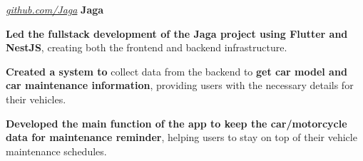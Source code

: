\documentclass[../main.tex]{subfiles}
\begin{document}
\vspace{0.2 cm}

\begin{twocolentry}{
    \small
    \textit{\href{https://github.com/cattyman919/Jaga}{github.com/Jaga}}
}
    \textbf{Jaga}
\end{twocolentry}

\vspace{0.10 cm}
\begin{onecolentry}
\begin{highlights}
    \item \textbf{Led the fullstack development of the Jaga project using Flutter and NestJS}, creating both the frontend and backend infrastructure.
    \item \textbf{Created a system to} collect data from the backend to \textbf{get car model and car maintenance information}, providing users with the necessary details for their vehicles.
    \item \textbf{Developed the main function of the app to keep the car/motorcycle data for maintenance reminder}, helping users to stay on top of their vehicle maintenance schedules.
\end{highlights}
\end{onecolentry}
\end{document}
